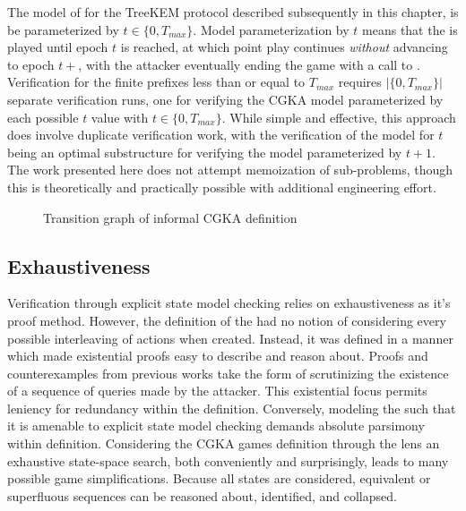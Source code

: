 The model of \CGKAsec for the TreeKEM protocol described subsequently in this chapter, is be parameterized by $t \in \{ 0, T_{max} \}$.
Model parameterization by $t$ means that the \CGKAsec is played until epoch $t$ is reached, at which point play continues \emph{without} advancing to epoch $t+$, with the attacker eventually ending the game with a call to .
Verification for the finite \CGKAsec prefixes less than or equal to \(T_{max}\) requires $|\{ 0, T_{max} \}|$ separate verification runs, one for verifying the CGKA model parameterized by each possible $t$ value with $t \in \{ 0, T_{max} \}$.
While simple and effective, this approach does involve duplicate verification work, with the verification of the model for $t$ being an optimal substructure for verifying the model parameterized by $t+1$.
The work presented here does not attempt memoization of sub-problems, though this is theoretically and practically possible with additional engineering effort.

\begin{figure}
  \centering
  \caption{\label{fig:CGKA-informal}Transition graph of informal CGKA definition}
\end{figure}



\hypertarget{sec:exhaustiveness}{%
\subsection{Exhaustiveness}\label{sec:exhaustiveness}}

Verification through explicit state model checking relies on exhaustiveness as it's proof method.
However, the definition of the \CGKAsec had no notion of considering every possible interleaving of actions when created.
Instead, it was defined in a manner which made existential proofs easy to describe and reason about.
Proofs and counterexamples from previous works \autocite{alwen2019double, alwen2020security} take the form of scrutinizing the existence of a sequence of queries made by the attacker.
This existential focus permits leniency for redundancy within the \CGKAsec definition.
Conversely, modeling the \CGKAsec such that it is amenable to explicit state model checking demands absolute parsimony within definition.
Considering the CGKA games definition through the lens an exhaustive state-space search, both conveniently and surprisingly, leads to many possible game simplifications.
Because all states are considered, equivalent or superfluous sequences can be reasoned about, identified, and collapsed.

